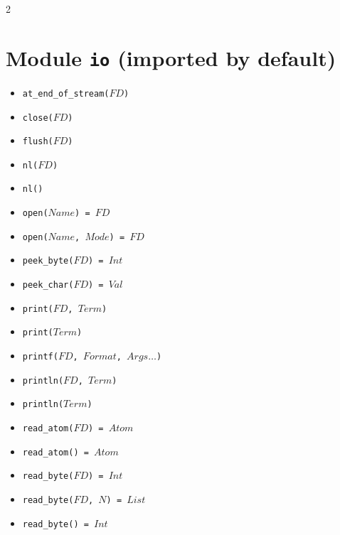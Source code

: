\documentclass[10pt]{article}
\begin{document}
\begin{multicols}{2}
\begin{scriptsize}
\begin{itemize}
\end{itemize}
\end{scriptsize}
\section*{Module \texttt{io} (imported by default)}
\begin{scriptsize}
\begin{itemize}
   \item \texttt{at\_end\_of\_stream($FD$)}
   \item \texttt{close($FD$)}
   \item \texttt{flush($FD$)}
   \item \texttt{nl($FD$)}
   \item \texttt{nl()}
   \item \texttt{open($Name$) = $FD$}
   \item \texttt{open($Name$, $Mode$) = $FD$}
   \item \texttt{peek\_byte($FD$) = $Int$}
   \item \texttt{peek\_char($FD$) = $Val$}
   \item \texttt{print($FD$, $Term$)}
   \item \texttt{print($Term$)}
   \item \texttt{printf($FD$, $Format$, $Args\ldots$)}
   \item \texttt{println($FD$, $Term$)}
   \item \texttt{println($Term$)}
   \item \texttt{read\_atom($FD$) = $Atom$}
   \item \texttt{read\_atom() = $Atom$}
   \item \texttt{read\_byte($FD$) = $Int$}
   \item \texttt{read\_byte($FD$, $N$) = $List$}
   \item \texttt{read\_byte() = $Int$}

\end{itemize}
\end{scriptsize}
\end{multicols}
\end{document}
